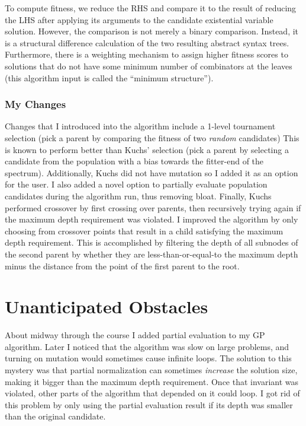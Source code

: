 \documentclass{article}
\begin{document}
To compute fitness, we reduce the RHS and compare it to the result of
reducing the LHS after applying its arguments to the candidate
existential variable solution. However, the comparison is not merely a
binary comparison. Instead, it is a structural difference calculation
of the two resulting abstract syntax trees. Furthermore, there is a
weighting mechanism to assign higher fitness scores to solutions that
do not have some minimum number of combinators at the leaves (this
algorithm input is called the ``minimum structure'').

\subsubsection{My Changes}

Changes that I introduced into the algorithm include a 1-level
tournament selection (pick a parent by comparing the fitness of two
\textit{random} candidates)
This is known to perform better than Kuchs' selection (pick a parent
by selecting a candidate from the population with a bias towards the
fitter-end of the spectrum).
Additionally, Kuchs did not have mutation so I added it as an option
for the user.
I also added a novel option to partially evaluate population
candidates during the algorithm run, thus removing bloat. Finally,
Kuchs performed crossover by first crossing over parents, then
recursively trying again if the maximum depth requirement was
violated. I improved the algorithm by only choosing from crossover
points that result in a child satisfying the maximum depth
requirement. This is accomplished by filtering the depth of all
subnodes of the second parent by whether they are
less-than-or-equal-to the maximum depth minus the distance from the
point of the first parent to the root.

\section{Unanticipated Obstacles}

About midway through the course I added partial evaluation to my GP
algorithm. Later I noticed that the algorithm was slow on large
problems, and turning on mutation would sometimes cause infinite
loops. The solution to this mystery was that partial normalization can
sometimes \textit{increase} the solution size, making it bigger than
the maximum depth requirement. Once that invariant was violated, other
parts of the algorithm that depended on it could loop. I got rid of
this problem by only using the partial evaluation result if its depth
was smaller than the original candidate.
\end{document}
